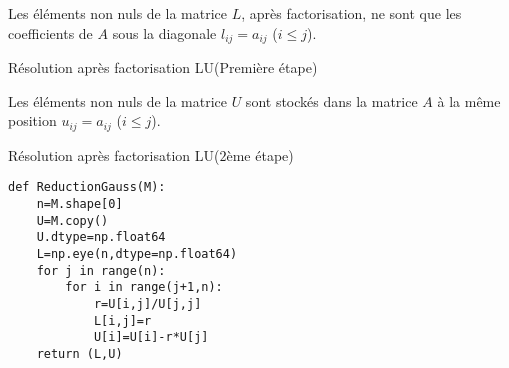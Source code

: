 \documentclass{beamer}
\newenvironment{algo}{
\begin{algorithm}[H]
\DontPrintSemicolon \SetAlgoVlined}
{\end{algorithm}}
\begin{document}
\begin{frame}

Les éléments non nuls de la matrice $L$, après factorisation, ne sont que les coefficients de $A$ sous la diagonale $l_{ij}=a_{ij}$ ($i \leqslant j$).

\begin{algo}
\caption{Résolution après factorisation LU(Première étape)}
\end{algo}

Les éléments non nuls de la matrice $U$ sont stockés dans la matrice $A$ à la même position $u_{ij}=a_{ij}$ ($i \leqslant j$).

\begin{algo}
\caption{Résolution après factorisation LU($2$ème étape)}
\end{algo}


\end{frame}


\begin{frame}[fragile]

\begin{verbatim}
def ReductionGauss(M):
    n=M.shape[0]
    U=M.copy()
    U.dtype=np.float64
    L=np.eye(n,dtype=np.float64)
    for j in range(n):
        for i in range(j+1,n):
            r=U[i,j]/U[j,j]
            L[i,j]=r
            U[i]=U[i]-r*U[j]
    return (L,U)

\end{verbatim}
\end{frame}




\end{document}
